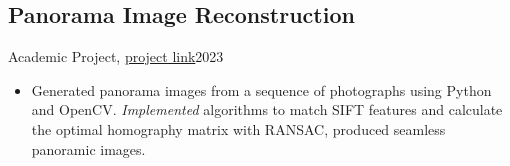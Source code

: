 \subsection{Panorama Image Reconstruction}{Academic Project, \href{https://github.com/Danial-Kord/Panorama}{project link}}{2023}
\begin{itemize}
    \item Generated panorama images from a sequence of photographs using Python and OpenCV. \emph{Implemented} algorithms to match SIFT features and calculate the optimal homography matrix with RANSAC, produced seamless panoramic images.
\end{itemize}
